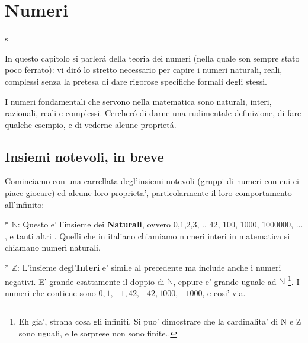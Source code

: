 \label{numeri}
\chapter{Numeri}



s%

In questo capitolo si parler\'a della teoria dei numeri (nella quale son sempre stato poco ferrato): vi dir\'o lo stretto necessario per capire i numeri naturali,
reali, complessi senza la pretesa di dare rigorose specifiche formali degli stessi.

I numeri fondamentali che servono nella matematica sono naturali, interi, razionali, reali e complessi. Cercher\'o di darne una rudimentale definizione,
di fare qualche esempio, e di vederne alcune propriet\'a.

\section{Insiemi notevoli, in breve}

Cominciamo con una carrellata degl'insiemi notevoli (gruppi di numeri con cui ci piace giocare) ed alcune loro proprieta', particolarmente il loro comportamento all'infinito:

* $\mathbb{N}$: Questo e' l'insieme dei \textbf{Naturali}, ovvero {0,1,2,3, .. 42, 100, 1000, 1000000, ... , e tanti altri }. Quelli che in
  italiano chiamiamo numeri interi in matematica si chiamano numeri naturali.

* $\mathbb{Z}$: L'insieme degl'\textbf{Interi} e' simile al precedente ma include anche i numeri negativi. 
 E' grande esattamente il doppio di $\mathbb{N}$, eppure e' grande uguale ad $\mathbb{N}$ \footnote{Eh gia', strana cosa gli infiniti. Si puo' dimostrare che la cardinalita' di N e Z sono uguali, e le sorprese non sono finite.. }.
 I numeri che contiene sono $0,1,-1,42,-42,1000,-1000$, e cosi' via.

